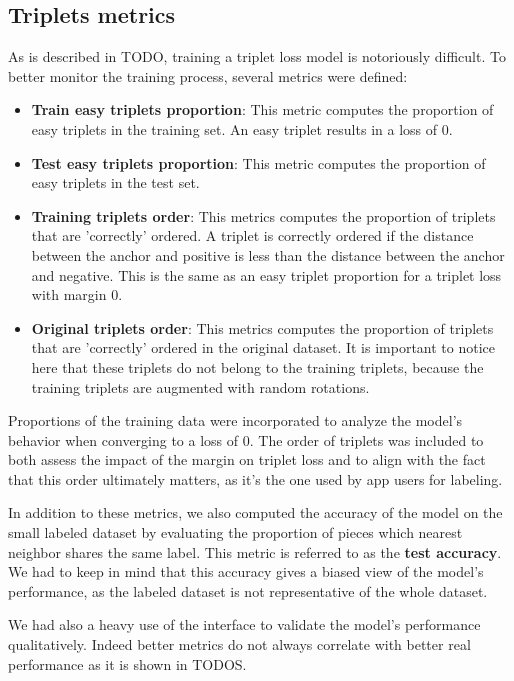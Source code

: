 \subsection{Triplets metrics}

As is described in TODO, training a triplet loss model is notoriously difficult. To better monitor the training process, several metrics were defined:
\begin{itemize}
    \item \textbf{Train easy triplets proportion}: This metric computes the proportion of easy triplets in the training set. An easy triplet results in a loss of 0.
    \item \textbf{Test easy triplets proportion}: This metric computes the proportion of easy triplets in the test set. 
    \item \textbf{Training triplets order}: This metrics computes the proportion of triplets that are 'correctly' ordered. A triplet is correctly ordered if the distance between the anchor and positive is less than the distance between the anchor and negative. This is the same as an easy triplet proportion for a triplet loss with margin 0.
    \item \textbf{Original triplets order}: This metrics computes the proportion of triplets that are 'correctly' ordered in the original dataset. It is important to notice here that these triplets do not belong to the training triplets, because the training triplets are augmented with random rotations.
\end{itemize}

Proportions of the training data were incorporated to analyze the model's behavior when converging to a loss of 0. The order of triplets was included to both assess the impact of the margin on triplet loss and to align with the fact that this order ultimately matters, as it's the one used by app users for labeling.

In addition to these metrics, we also computed the accuracy of the model on the small labeled dataset by evaluating the proportion of pieces which nearest neighbor shares the same label. This metric is referred to as the \textbf{test accuracy}. We had to keep in mind that this accuracy gives a biased view of the model's performance, as the labeled dataset is not representative of the whole dataset.

We had also a heavy use of the interface to validate the model's performance qualitatively. Indeed better metrics do not always correlate with better real performance as it is shown in TODOS.

